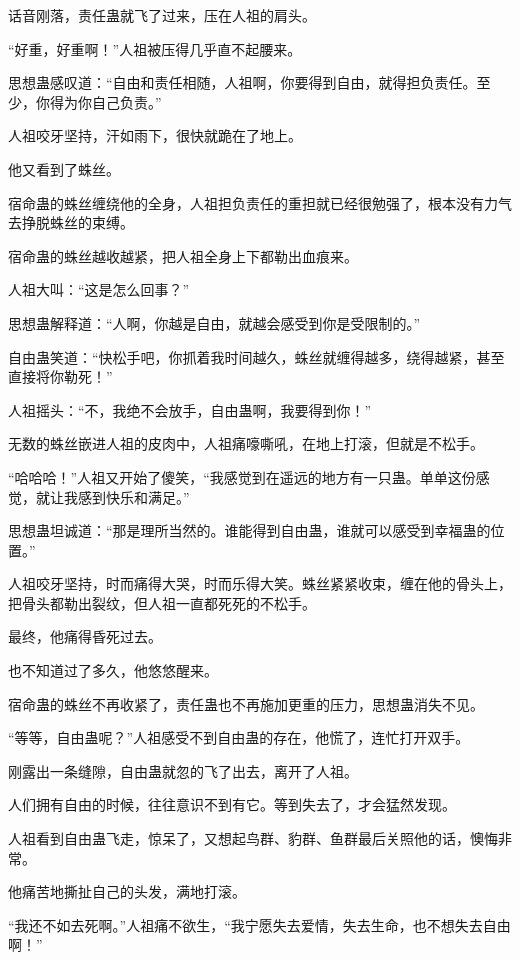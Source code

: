 \begin{this_body}
话音刚落，责任蛊就飞了过来，压在人祖的肩头。

“好重，好重啊！”人祖被压得几乎直不起腰来。

思想蛊感叹道：“自由和责任相随，人祖啊，你要得到自由，就得担负责任。至少，你得为你自己负责。”

人祖咬牙坚持，汗如雨下，很快就跪在了地上。

他又看到了蛛丝。

宿命蛊的蛛丝缠绕他的全身，人祖担负责任的重担就已经很勉强了，根本没有力气去挣脱蛛丝的束缚。

宿命蛊的蛛丝越收越紧，把人祖全身上下都勒出血痕来。

人祖大叫：“这是怎么回事？”

思想蛊解释道：“人啊，你越是自由，就越会感受到你是受限制的。”

自由蛊笑道：“快松手吧，你抓着我时间越久，蛛丝就缠得越多，绕得越紧，甚至直接将你勒死！”

人祖摇头：“不，我绝不会放手，自由蛊啊，我要得到你！”

无数的蛛丝嵌进人祖的皮肉中，人祖痛嚎嘶吼，在地上打滚，但就是不松手。

“哈哈哈！”人祖又开始了傻笑，“我感觉到在遥远的地方有一只蛊。单单这份感觉，就让我感到快乐和满足。”

思想蛊坦诚道：“那是理所当然的。谁能得到自由蛊，谁就可以感受到幸福蛊的位置。”

人祖咬牙坚持，时而痛得大哭，时而乐得大笑。蛛丝紧紧收束，缠在他的骨头上，把骨头都勒出裂纹，但人祖一直都死死的不松手。

最终，他痛得昏死过去。

也不知道过了多久，他悠悠醒来。

宿命蛊的蛛丝不再收紧了，责任蛊也不再施加更重的压力，思想蛊消失不见。

“等等，自由蛊呢？”人祖感受不到自由蛊的存在，他慌了，连忙打开双手。

刚露出一条缝隙，自由蛊就忽的飞了出去，离开了人祖。

人们拥有自由的时候，往往意识不到有它。等到失去了，才会猛然发现。

人祖看到自由蛊飞走，惊呆了，又想起鸟群、豹群、鱼群最后关照他的话，懊悔非常。

他痛苦地撕扯自己的头发，满地打滚。

“我还不如去死啊。”人祖痛不欲生，“我宁愿失去爱情，失去生命，也不想失去自由啊！”

\end{this_body}


